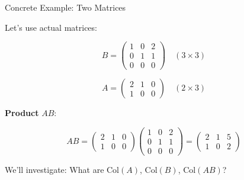 \documentclass[10pt]{beamer}
\theoremstyle{definition}
\newcommand{\x}[1]{\alert{\textbf{#1}}}
\begin{document}
\begin{frame}[fragile]{Concrete Example: Two Matrices}

Let's use actual matrices:

\vspace{1em}

$$B = \begin{pmatrix} 1 & 0 & 2 \\ 0 & 1 & 1 \\ 0 & 0 & 0 \end{pmatrix} \quad (3 \times 3)$$

$$A = \begin{pmatrix} 2 & 1 & 0 \\ 1 & 0 & 0 \end{pmatrix} \quad (2 \times 3)$$

\vspace{1em}

\x{Product} $AB$:

$$AB = \begin{pmatrix} 2 & 1 & 0 \\ 1 & 0 & 0 \end{pmatrix} \begin{pmatrix} 1 & 0 & 2 \\ 0 & 1 & 1 \\ 0 & 0 & 0 \end{pmatrix} = \begin{pmatrix} 2 & 1 & 5 \\ 1 & 0 & 2 \end{pmatrix}$$

\vspace{1em}

We'll investigate: What are $\text{Col}(A)$, $\text{Col}(B)$, $\text{Col}(AB)$?

\end{frame}
\end{document}
